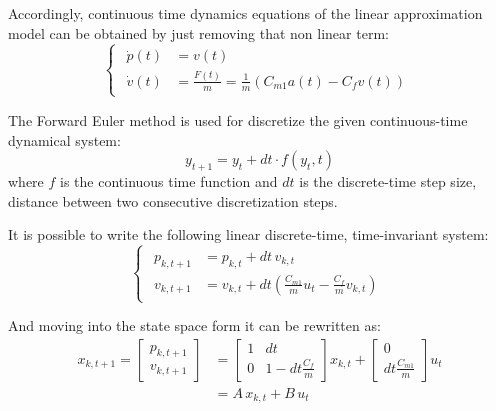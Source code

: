 \documentclass[a4paper,12pt,oneside]{book}
\begin{document}
Accordingly, continuous time dynamics equations of the linear approximation model can be obtained by just removing that non linear term:
\begin{equation}
\begin{cases}
 	\begin{aligned}
		\dot{p}(t) &= v(t) \\
		\dot{v}(t) &= \frac{F(t)}{m} = \frac{1}{m} (C_{m1} a(t) - C_f v(t) )
	\end{aligned}
\end{cases}
\label{CT_Linear_dynamics}
\end{equation}

\bigskip
The Forward Euler method is used for discretize the given continuous-time dynamical system:
\begin{equation}
    y_{t+1} = y_t + dt \cdot f(y_t, t) 
\end{equation}
where $f$ is the continuous time function and $dt$ is the discrete-time step size, distance between two consecutive discretization steps.

It is possible to write the following linear discrete-time, time-invariant system:
\begin{equation}
\begin{cases}
	\begin{aligned}
		p_{k,t+1} &= p_{k,t} + dt \, v_{k,t} \\
		v_{k,t+1} &= v_{k,t} + dt \left( \frac{C_{m1}}{m} u_t - \frac{C_f}{m} v_{k,t}  \right)
	\end{aligned}
\end{cases}
\end{equation}

And moving into the state space form it can be rewritten as:
\begin{equation}
    \begin{aligned}
    	x_{k,t+1} = 
    		\begin{bmatrix}
    			p_{k,t+1} \\
    			v_{k,t+1}
    		\end{bmatrix}
    		& =
    		\begin{bmatrix}
    			1 & dt \\
    			0 & 1-dt\frac{C_f}{m}
    		\end{bmatrix}
    		x_{k,t}
    		+
    		\begin{bmatrix}
    			0 \\
    			dt \frac{C_{m1}}{m}
    		\end{bmatrix}
    		u_t \\
    		& = A \, x_{k,t} + B \, u_t
    \end{aligned}
\label{Linear_system}
\end{equation}
\end{document}
